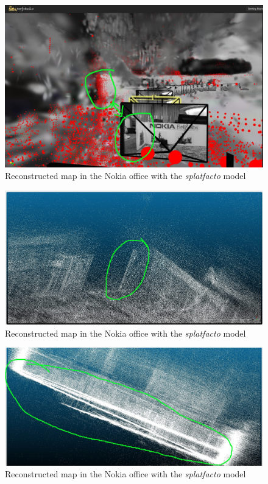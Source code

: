 \begin{figure}[htbp]
	\centering
	\includegraphics[width=150mm, keepaspectratio]{figures_jpg/trajectory_and_pointcloud_debug.jpg}
	\caption{Reconstructed map in the Nokia office with the \textit{splatfacto} model}
	\label{fig:trajectory_and_pointcloud}
\end{figure}

\begin{figure}[htbp]
	\centering
	\includegraphics[width=150mm, keepaspectratio]{figures_jpg/pointcloud_debug.jpg}
	\caption{Reconstructed map in the Nokia office with the \textit{splatfacto} model}
	\label{fig:pointcloud_debug}
\end{figure}

\begin{figure}[htbp]
	\centering
	\includegraphics[width=150mm, keepaspectratio]{figures_jpg/pointcloud_debug1.jpg}
	\caption{Reconstructed map in the Nokia office with the \textit{splatfacto} model}
	\label{fig:pointcloud_debug1}
\end{figure}




